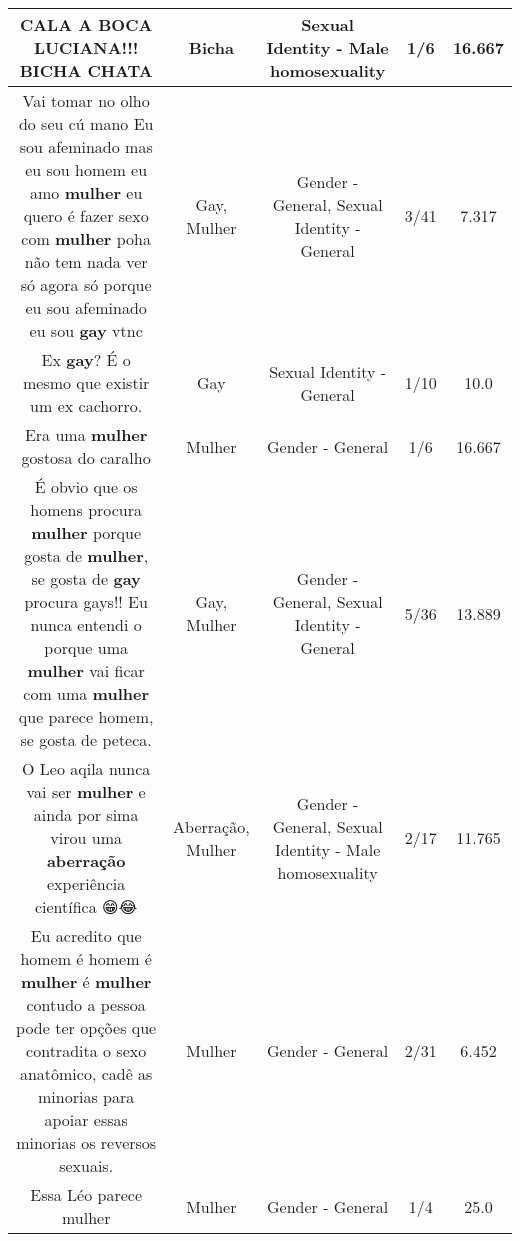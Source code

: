 \documentclass[11pt]{article}
\newlength\mylength
\begin{document}
\begin{center}
\begin{longtable}{|C{.65\mylength}|C{.30\mylength}|C{.12\mylength}|C{.12\mylength}|C{.12\mylength}|}
  \small CALA A BOCA LUCIANA!!! \textbf{BICHA} CHATA\normalsize   & Bicha & Sexual Identity - Male homosexuality & 1/6 & 16.667 \\  \hline
  \small Vai tomar no olho do seu cú mano Eu sou afeminado mas eu sou homem eu amo \textbf{mulher} eu quero é fazer sexo com \textbf{mulher} poha não tem nada ver só agora só porque eu sou afeminado eu sou \textbf{gay} vtnc\normalsize   & Gay, Mulher & Gender - General, Sexual Identity - General & 3/41 & 7.317 \\  \hline
  \small Ex \textbf{gay}? É o mesmo que existir um ex cachorro.\normalsize   & Gay & Sexual Identity - General & 1/10 & 10.0 \\  \hline
  \small Era uma \textbf{mulher} gostosa do caralho\normalsize   & Mulher & Gender - General & 1/6 & 16.667 \\  \hline
  \small É obvio que os homens procura \textbf{mulher} porque gosta de \textbf{mulher},  se gosta de \textbf{gay} procura gays!!  Eu nunca entendi o porque uma \textbf{mulher} vai ficar com uma \textbf{mulher} que parece homem,  se gosta de peteca.\normalsize   & Gay, Mulher & Gender - General, Sexual Identity - General & 5/36 & 13.889 \\  \hline
  \small O Leo aqila nunca vai ser \textbf{mulher} e ainda por sima virou uma \textbf{aberração} experiência científica 😁😂\normalsize   & Aberração, Mulher & Gender - General, Sexual Identity - Male homosexuality & 2/17 & 11.765 \\  \hline
  \small Eu acredito que homem é homem é \textbf{mulher} é \textbf{mulher} contudo a pessoa pode ter opções que contradita o sexo anatômico, cadê as minorias para apoiar essas minorias os reversos sexuais.\normalsize   & Mulher & Gender - General & 2/31 & 6.452 \\  \hline
  \small Essa Léo parece mulher\normalsize   & Mulher & Gender - General & 1/4 & 25.0 \\  \hline

\end{longtable}
\end{center}
\end{document}
